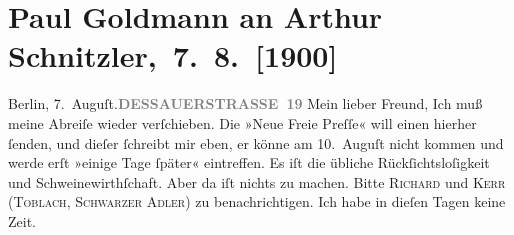 

         
         \renewcommand{\erwaehntePersonen}{Personen:  ?? [Urlaubsvertretung von Paul Goldmann, 2. Augusthälfte 1900], Richard Beer-Hofmann, Georg Brandes, Alfred Kerr}
         \renewcommand{\erwaehnteInstitutionen}{Institutionen: Neue Freie Presse}
         \renewcommand{\erwaehnteOrte}{Orte: Bad Ischl, Berlin, Dessauer Straße, Schwarzer Adler, Toblach}
         \renewcommand{\erwaehnteWerke}{}
               \section[ Paul Goldmann an Arthur Schnitzler, 7. 8. {[}1900{]}]{ Paul Goldmann an Arthur Schnitzler, 7. 8. {[}1900{]}}\nopagebreak{}\rehead{ }\begin{ledgroupsized}[t]{13cm}\normalsize\beginnumbering \toendnotes[C]{\smallbreak\pagebreak[2]} 
\toendnotes[C]{\smallbreak}\pstart
           \noindent{}{\pb}Berlin, 7. Auguſt.\hfill \textcolor{gray}{\textbf{DESSAUERSTRASSE 19}}\pend
           \pstart
           \centering{}Mein lieber Freund,\pend
           \pstart
           \noindent{}Ich muß meine Abreiſe wieder verſchieben. Die »Neue
                  Freie Preſſe« will einen \label{K_L02927-1v}\label{K_L02927-1h}{ }hierher ſenden, und dieſer
               ſchreibt mir eben, er könne am 10. Auguſt nicht kommen
               und werde erſt »einige Tage ſpäter« eintreffen. 
               Es iſt die  übliche Rückſichtsloſigkeit und Schweinewirthſchaft. Aber da iſt nichts zu
               machen. {\pb}Bitte \textsc{Richard} und \textsc{Kerr} (\textsc{Toblach}, \textsc{Schwarzer Adler}) zu benachrichtigen. Ich habe in dieſen Tagen keine Zeit.\pend

\end{ledgroupsized}
